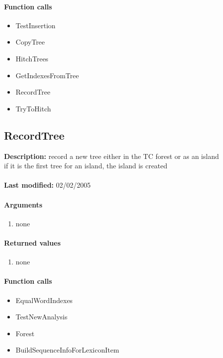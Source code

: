 \paragraph{Function calls}
\begin{itemize}
\item TestInsertion
\item CopyTree
\item HitchTrees
\item GetIndexesFromTree
\item RecordTree
\item TryToHitch
\end{itemize}

\subsection{RecordTree}
\textbf{Description:} record a new tree either in the TC forest or as an island\\
if it is the first tree for an island, the island is created\\
\\\textbf{Last modified:} 02/02/2005

\paragraph{Arguments}
\begin{enumerate}
\item none
\end{enumerate}

\paragraph{Returned values}
\begin{enumerate}
\item none
\end{enumerate}

\paragraph{Function calls}
\begin{itemize}
\item EqualWordIndexes
\item TestNewAnalysis
\item Forest
\item BuildSequenceInfoForLexiconItem
\end{itemize}

